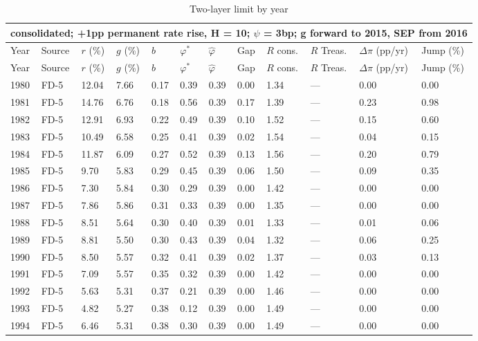 {\scriptsize\setlength{\tabcolsep}{3pt}
\begin{longtable}{llllllllllll}
\caption{Two-layer limit by year}\label{tab:annual}\\
\multicolumn{12}{l}{consolidated; +1pp permanent rate rise, H = 10; $\psi$ = 3bp; g forward to 2015, SEP from 2016}\\
\toprule
Year & Source & $r$ (\%) & $g$ (\%) & $b$ & $\varphi^*$ & $\hat\varphi$ & Gap & $R$ cons. & $R$ Treas. & $\Delta\pi$ (pp/yr) & Jump (\%) \\
\midrule
\endfirsthead
\toprule
Year & Source & $r$ (\%) & $g$ (\%) & $b$ & $\varphi^*$ & $\hat\varphi$ & Gap & $R$ cons. & $R$ Treas. & $\Delta\pi$ (pp/yr) & Jump (\%) \\
\midrule
\endhead
1980 & FD-5 & 12.04 & 7.66 & 0.17 & 0.39 & 0.39 & 0.00 & 1.34 & — & 0.00 & 0.00 \\
1981 & FD-5 & 14.76 & 6.76 & 0.18 & 0.56 & 0.39 & 0.17 & 1.39 & — & 0.23 & 0.98 \\
1982 & FD-5 & 12.91 & 6.93 & 0.22 & 0.49 & 0.39 & 0.10 & 1.52 & — & 0.15 & 0.60 \\
1983 & FD-5 & 10.49 & 6.58 & 0.25 & 0.41 & 0.39 & 0.02 & 1.54 & — & 0.04 & 0.15 \\
1984 & FD-5 & 11.87 & 6.09 & 0.27 & 0.52 & 0.39 & 0.13 & 1.56 & — & 0.20 & 0.79 \\
1985 & FD-5 & 9.70 & 5.83 & 0.29 & 0.45 & 0.39 & 0.06 & 1.50 & — & 0.09 & 0.35 \\
1986 & FD-5 & 7.30 & 5.84 & 0.30 & 0.29 & 0.39 & 0.00 & 1.42 & — & 0.00 & 0.00 \\
1987 & FD-5 & 7.86 & 5.86 & 0.31 & 0.33 & 0.39 & 0.00 & 1.35 & — & 0.00 & 0.00 \\
1988 & FD-5 & 8.51 & 5.64 & 0.30 & 0.40 & 0.39 & 0.01 & 1.33 & — & 0.01 & 0.06 \\
1989 & FD-5 & 8.81 & 5.50 & 0.30 & 0.43 & 0.39 & 0.04 & 1.32 & — & 0.06 & 0.25 \\
1990 & FD-5 & 8.50 & 5.57 & 0.32 & 0.41 & 0.39 & 0.02 & 1.37 & — & 0.03 & 0.13 \\
1991 & FD-5 & 7.09 & 5.57 & 0.35 & 0.32 & 0.39 & 0.00 & 1.42 & — & 0.00 & 0.00 \\
1992 & FD-5 & 5.63 & 5.31 & 0.37 & 0.21 & 0.39 & 0.00 & 1.46 & — & 0.00 & 0.00 \\
1993 & FD-5 & 4.82 & 5.27 & 0.38 & 0.12 & 0.39 & 0.00 & 1.49 & — & 0.00 & 0.00 \\
1994 & FD-5 & 6.46 & 5.31 & 0.38 & 0.30 & 0.39 & 0.00 & 1.49 & — & 0.00 & 0.00 \\

\end{longtable}}
